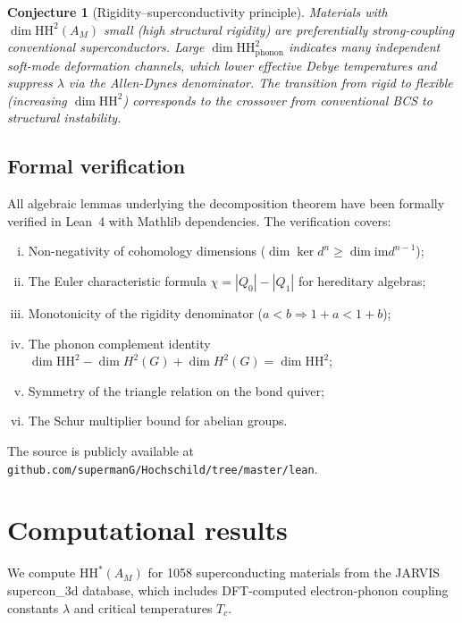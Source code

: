 \documentclass[12pt,a4paper]{article}
\newtheorem{conjecture}[theorem]{Conjecture}
\newcommand{\HH}{\mathrm{HH}}
\newcommand{\im}{\mathrm{im}}
\begin{document}
\begin{conjecture}[Rigidity--superconductivity principle]
\label{conj:physical}
Materials with $\dim \HH^2(A_M)$ small (high structural rigidity)
are preferentially strong-coupling conventional superconductors.
Large $\dim \HH^2_{\mathrm{phonon}}$ indicates many independent
soft-mode deformation channels, which lower effective Debye
temperatures and suppress $\lambda$ via the Allen-Dynes denominator.
The transition from rigid to flexible (increasing $\dim\HH^2$)
corresponds to the crossover from conventional BCS to structural
instability.
\end{conjecture}

\subsection{Formal verification}

All algebraic lemmas underlying the decomposition theorem have been
formally verified in Lean~4 with Mathlib dependencies.  The
verification covers:
\begin{enumerate}[(i)]
  \item Non-negativity of cohomology dimensions
    ($\dim\ker d^n \geq \dim\im d^{n-1}$);
  \item The Euler characteristic formula
    $\chi = |Q_0| - |Q_1|$ for hereditary algebras;
  \item Monotonicity of the rigidity denominator
    ($a < b \Rightarrow 1+a < 1+b$);
  \item The phonon complement identity
    $\dim\HH^2 - \dim H^2(G) + \dim H^2(G) = \dim\HH^2$;
  \item Symmetry of the triangle relation on the bond quiver;
  \item The Schur multiplier bound for abelian groups.
\end{enumerate}
The source is publicly available at
\texttt{github.com/supermanG/Hochschild/tree/master/lean}.

\section{Computational results}
\label{sec:results}

We compute $\HH^*(A_M)$ for 1058 superconducting materials from the
JARVIS supercon\_3d database, which includes DFT-computed
electron-phonon coupling constants $\lambda$ and critical
temperatures $T_c$.
\end{document}
